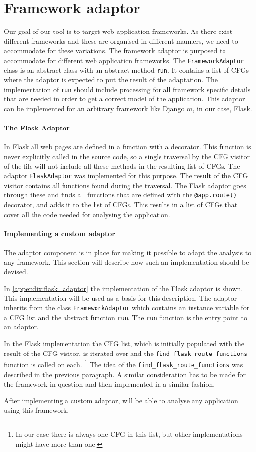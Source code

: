 \section{Framework adaptor}\label{framework_adaptor}
Our goal of our tool is to target web application frameworks.
As there exist different frameworks and these are organised in different manners, we need to accommodate for these variations.
The framework adaptor is purposed to accommodate for different web application frameworks.
The \texttt{FrameworkAdaptor} class is an abstract class with an abstract method \texttt{run}.
It contains a list of CFGs where the adaptor is expected to put the result of the adaptation.
The implementation of \texttt{run} should include processing for all framework specific details that are needed in order to get a correct model of the application.
This adaptor can be implemented for an arbitrary framework like Django or, in our case, Flask.

\paragraph{The Flask Adaptor}
In Flask all web pages are defined in a function with a decorator.
This function is never explicitly called in the source code, so a single traversal by the CFG visitor of the file will not include all these methods in the resulting list of CFGs.
The adaptor \texttt{FlaskAdaptor} was implemented for this purpose.
The result of the CFG visitor contains all functions found during the traversal.
The Flask adaptor goes through these and finds all functions that are defined with the \texttt{@app.route()} decorator, and adds it to the list of CFGs.
This results in a list of CFGs that cover all the code needed for analysing the application.

\paragraph{Implementing a custom adaptor}
The adaptor component is in place for making it possible to adapt the analysis to any framework.
This section will describe how such an implementation should be devised.

In \cref{appendix:flask_adaptor} the implementation of the Flask adaptor is shown.
This implementation will be used as a basis for this description.
The adaptor inherits from the class \texttt{FrameworkAdaptor} which contains an instance variable for a CFG list and the abstract function \texttt{run}.
The \texttt{run} function is the entry point to an adaptor.

In the Flask implementation the CFG list, which is initially populated with the result of the CFG visitor, is iterated over and the \texttt{find\_flask\_route\_functions} function is called on each. \footnote{In our case there is always one CFG in this list, but other implementations might have more than one.}
The idea of the \texttt{find\_flask\_route\_functions} was described in the previous paragraph.
A similar consideration has to be made for the framework in question and then implemented in a similar fashion.

After implementing a custom adaptor, \pyt{} will be able to analyse any application using this framework.
  

